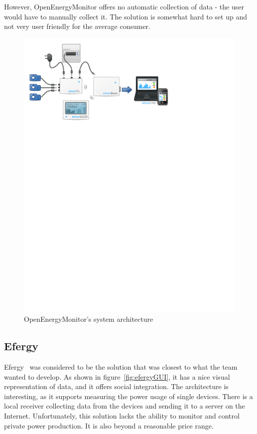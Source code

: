 However, OpenEnergyMonitor offers no automatic collection of data - the user would have to manually collect it. The solution is somewhat hard to set up and not very user friendly for the average consumer. 

\setcounter{figure}{1}
\begin{figure}[H]
\centering
\includegraphics[width=\textwidth, trim=0.5cm 19cm 6.5cm 0cm, clip]{ch/prestudy/fig/OEM_system.pdf}
\caption{OpenEnergyMonitor's system architecture}
\label{fig:oem}
\end{figure}


\subsection{Efergy}

Efergy~\cite{efergy} was considered to be the solution that was closest to what the team wanted to develop. As shown in figure~\ref{fig:efergyGUI}, it has a nice visual representation of data, and it offers social integration. The architecture is interesting, as it supports measuring the power usage of single devices. There is a local receiver collecting data from the devices and sending it to a server on the Internet. Unfortunately, this solution lacks the ability to monitor and control private power production. It is also beyond a reasonable price range.


